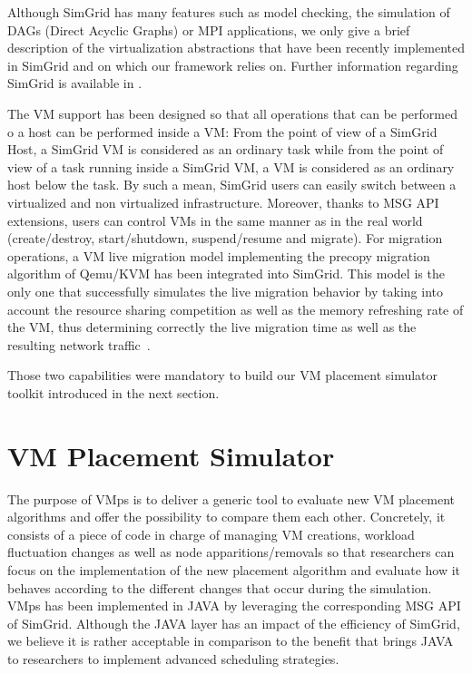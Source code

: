 \documentclass[conference]{IEEEtran}
\newcommand{\sg}{SimGrid\xspace}
\newcommand{\vmps}{VMps\xspace}
\begin{document}
Although SimGrid has many features such as model checking, the
simulation of DAGs (Direct Acyclic Graphs) or MPI applications, we
only give a brief description of the  virtualization  abstractions
that have been recently implemented in \sg and on which our framework relies
on.  Further information regarding \sg is available in \cite{casanova:hal-01017319}.

The VM support has been designed so that all operations that can be performed
o a host can be performed inside a VM: From the point of view of a \sg
Host, a \sg VM is considered as an ordinary task while from the point
of view of a task running inside a \sg VM, a VM is considered as an
ordinary host below the task.  By such a mean, \sg users can easily
switch between a virtualized and non virtualized infrastructure.
Moreover, thanks to  MSG API extensions, users can control VMs in the
same manner as in the real world (\eg create/destroy, start/shutdown,
suspend/resume and migrate).
For migration operations, a VM live migration model implementing the
precopy migration algorithm of Qemu/KVM has been integrated into \sg.
This model is the only one that successfully simulates the live
migration behavior by taking into account the resource sharing
competition as well as the memory refreshing rate of the VM, thus
determining correctly the live migration time as well as the resulting
network traffic~\cite{Hirofuchi:2013:ALM:2568486.2568524}.

Those two capabilities were mandatory to build our VM placement
simulator toolkit introduced in the next section.

\section{VM Placement Simulator}
\label{sec:injector}

The purpose of \vmps is to deliver a generic tool
to evaluate new VM placement algorithms and offer the possibility to
compare them each other. Concretely, it consists of a piece of code in
charge of managing VM creations, workload fluctuation changes as well
as node apparitions/removals so that researchers can focus on the
implementation of the new placement algorithm and evaluate how it
behaves according to the different changes that occur during the
simulation.
%
\vmps has been implemented in JAVA by
leveraging the corresponding MSG API of \sg.  Although the JAVA layer
has an impact of the efficiency of \sg, we believe it is rather
acceptable in comparison to the benefit that brings JAVA  to researchers to
implement advanced scheduling strategies.
\end{document}
